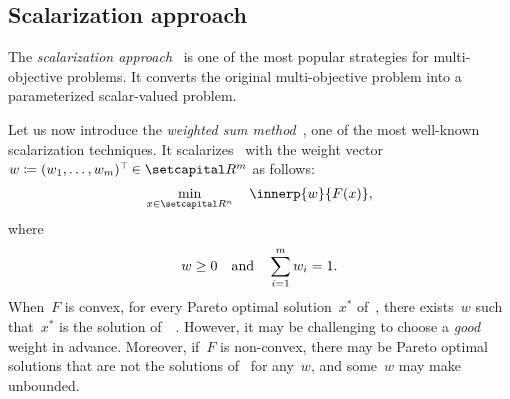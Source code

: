 \documentclass[../../main]{subfiles}
\begin{document}
\subsection{Scalarization approach}
The \emph{scalarization approach}~\cite{Gass1955,Geoffrion1968,Zadeh1963} is one of the most popular strategies for multi-objective problems.
It converts the original multi-objective problem into a parameterized scalar-valued problem.

Let us now introduce the \emph{weighted sum method}~\cite{Zadeh1963}, one of the most well-known scalarization techniques.
It scalarizes~ with the weight vector~$w \coloneqq (w_1, \dots, w_m)^\T \in \setR^m$ as follows:
\begin{equation} \label{eq:weighted}
    \min_{x \in \setR^n} \quad \innerp{w}{F(x)}
,\end{equation} 
where
\begin{equation}
    w \ge 0 \quad \text{and} \quad \sum_{i = 1}^{m} w_i = 1
.\end{equation} 
When~$F$ is convex, for every Pareto optimal solution~$x^\ast$ of~, there exists~$w$ such that~$x^\ast$ is the solution of~~\cite{Miettinen1998}.
However, it may be challenging to choose a \emph{good} weight in advance.
Moreover, if~$F$ is non-convex, there may be Pareto optimal solutions that are not the solutions of~ for any~$w$, and some~$w$ may make~ unbounded.
\end{document}
